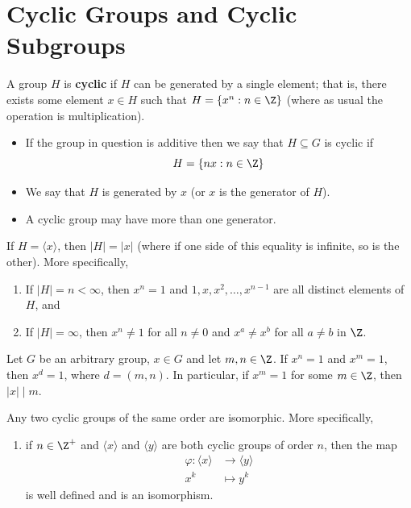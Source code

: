 \section{Cyclic Groups and Cyclic Subgroups}

\begin{definition}[Cyclic]
    A group \( H \) is \textbf{cyclic} if \( H  \) can be generated by a single element; that is, there exists some element \( x \in H  \) such that \( H = \{ x^{n} : n \in \Z  \}  \) (where as usual the operation is multiplication).
\end{definition}

\begin{itemize}
    \item If the group in question is additive then we say that \( H \subseteq  G   \) is cyclic if 
        \[  H = \{ n x : n \in \Z  \}  \]
    \item We say that \( H  \) is generated by \( x  \) (or \( x  \) is the generator of \( H \)). 
    \item A cyclic group may have more than one generator.
\end{itemize}

\begin{prop}
   If \( H = \langle x \rangle   \), then \( | H  |  = | x  |  \) (where if one side of this equality is infinite, so is the other). More specifically, 
   \begin{enumerate}
       \item[(1)] If \( | H  |  = n < \infty  \), then \( x^{n} = 1  \) and \( 1, x, x^{2}, \dots, x^{n-1} \) are all distinct elements of \( H  \), and
        \item[(2)] If \( | H  |  = \infty  \), then \( x^{n} \neq 1  \) for all \( n \neq 0  \) and \( x^{a} \neq x^{b} \) for all \( a \neq b  \) in \( \Z  \).
   \end{enumerate}
\end{prop}

\begin{prop}[(3)]
   Let \( G  \) be an arbitrary group, \( x \in G  \) and let \( m,n \in \Z  \). If \( x^{n} = 1  \) and \( x^{m} = 1  \), then \( x^{d} = 1  \), where \( d = (m,n) \). In particular, if \( x^{m} = 1  \) for some \( m \in \Z  \), then \( | x  |  \mid m \). 
\end{prop}

\begin{theorem}[(4)]
   Any two cyclic groups of the same order are isomorphic. More specifically, 
   \begin{enumerate}
       \item[(1)] if \( n \in \Z^{+} \) and \( \langle x  \rangle\) and \( \langle y \rangle \) are both cyclic groups of order \( n  \), then the map 
           \begin{align*}
               \varphi : \langle x \rangle &\to \langle y \rangle  \\
                                         x^{k}  &\mapsto y^{k}
           \end{align*}
           is well defined and is an isomorphism.
   \end{enumerate}
\end{theorem}

